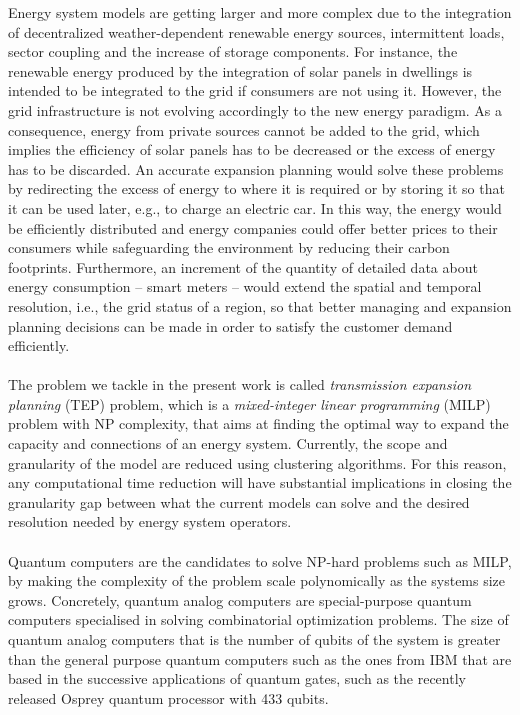 Energy system models are getting larger and more complex due to the integration of decentralized weather-dependent renewable energy sources, intermittent loads, sector coupling and the increase of storage components. For instance, the renewable energy produced by the integration of solar panels in dwellings is intended to be integrated to the grid if consumers are not using it. However, the grid infrastructure is not evolving accordingly to the new energy paradigm. As a consequence, energy from private sources cannot be added to the grid, which implies the efficiency of solar panels has to be decreased or the excess of energy has to be discarded. An accurate expansion planning would solve these problems by redirecting the excess of energy to where it is required or by storing it so that it can be used later, e.g., to charge an electric car. In this way, the energy would be efficiently distributed and energy companies could offer better prices to their consumers while safeguarding the environment by reducing their carbon footprints. Furthermore, an increment of the quantity of detailed data about energy consumption -- smart meters -- would extend the spatial and temporal resolution, i.e., the grid status of a region, so that better managing and expansion planning decisions can be made in order to satisfy the customer demand efficiently.\\\\ 
The problem we tackle in the present work is called \textit{transmission expansion planning} (TEP) problem, which is a \textit{mixed-integer linear programming} (MILP) problem with NP complexity, that aims at finding the optimal way to expand the capacity and connections of an energy system. Currently, the scope and granularity of the model are reduced using clustering algorithms. For this reason, any computational time reduction will have substantial implications in closing the granularity gap between what the current models can solve and the desired resolution needed by energy system operators.\\\\
Quantum computers are the candidates to solve NP-hard problems such as MILP, by making the complexity of the problem scale polynomically as the systems size grows. Concretely, quantum analog computers are special-purpose quantum computers specialised in solving combinatorial optimization problems. The size of quantum analog computers that is the number of qubits of the system is greater than the general purpose quantum computers such as the ones from IBM that are based in the successive applications of quantum gates, such as the recently released Osprey quantum processor with 433 qubits.
